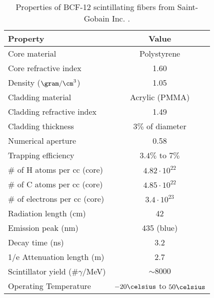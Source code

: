 \begin{table}[htbp]
\centering{}%
\begin{tabular}{lc}
\toprule 
Property & Value \tabularnewline
\midrule
\midrule 
Core material & Polystyrene \tabularnewline
Core refractive index & 1.60 \tabularnewline
Density ($\gram/\cm^3$) & 1.05 \tabularnewline
Cladding material & Acrylic (PMMA) \tabularnewline
Cladding refractive index & 1.49 \tabularnewline
Cladding thickness & $3\%$ of diameter \tabularnewline
Numerical aperture & 0.58 \tabularnewline
Trapping efficiency & $3.4\%$ to $7\%$ \tabularnewline
$\#$ of H atoms per cc (core) & $4.82 \cdot{} 10^{22}$ \tabularnewline
$\#$ of C atoms per cc (core) & $4.85 \cdot{} 10^{22}$ \tabularnewline
$\#$ of electrons per cc (core) & $3.4 \cdot{} 10^{23}$ \tabularnewline
Radiation length (cm) & 42 \tabularnewline
Emission peak (nm) & 435 (blue) \tabularnewline
Decay time (ns) & 3.2 \tabularnewline
1/e Attenuation length (m) & 2.7 \tabularnewline
Scintillator yield (\#$\gamma$/MeV) & $\sim 8000$ \tabularnewline
Operating Temperature & $-20\celsius$ to $50\celsius$ \tabularnewline
\bottomrule
\end{tabular}
\caption{Properties of BCF-12 scintillating fibers from Saint-Gobain Inc. \cite{DataSheetBCF12Fiber}.}
\label{tab:ParametersFibersBCF12}
\end{table}